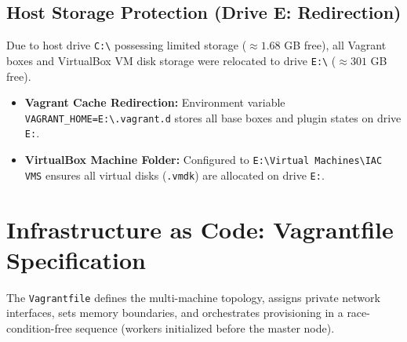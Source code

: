 \documentclass[11pt,a4paper]{article}
\begin{document}
\subsection{Host Storage Protection (Drive E: Redirection)}
Due to host drive \texttt{C:\textbackslash} possessing limited storage ($\approx 1.68$ GB free), all Vagrant boxes and VirtualBox VM disk storage were relocated to drive \texttt{E:\textbackslash} ($\approx 301$ GB free).
\begin{itemize}
    \item \textbf{Vagrant Cache Redirection:} Environment variable \texttt{VAGRANT\_HOME=E:\textbackslash.vagrant.d} stores all base boxes and plugin states on drive \texttt{E:}.
    \item \textbf{VirtualBox Machine Folder:} Configured to \texttt{E:\textbackslash Virtual Machines\textbackslash IAC VMS} ensures all virtual disks (\texttt{.vmdk}) are allocated on drive \texttt{E:}.
\end{itemize}

\section{Infrastructure as Code: Vagrantfile Specification}
The \texttt{Vagrantfile} defines the multi-machine topology, assigns private network interfaces, sets memory boundaries, and orchestrates provisioning in a race-condition-free sequence (workers initialized before the master node).
\end{document}
